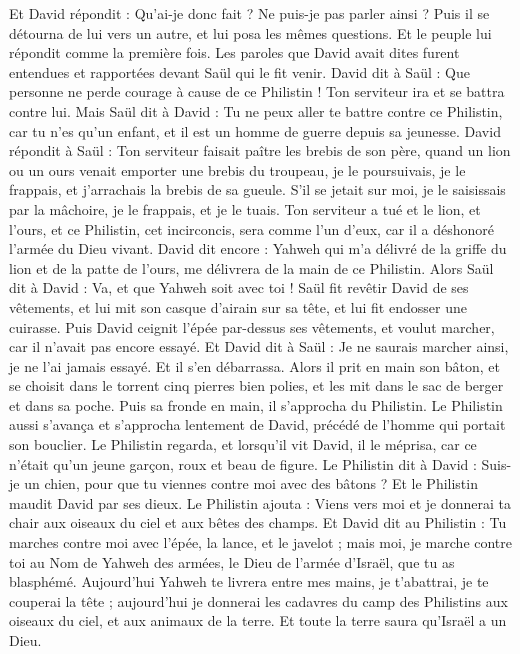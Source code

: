 \begin{multicols}{2}
Et David répondit : Qu'ai-je donc fait ? Ne puis-je pas parler ainsi ?
Puis il se détourna de lui vers un autre, et lui posa les mêmes questions. Et le peuple lui répondit comme la première fois.
Les paroles que David avait dites furent entendues et rapportées devant Saül qui le fit venir.
David dit à Saül : Que personne ne perde courage à cause de ce Philistin ! Ton serviteur ira et se battra contre lui.
Mais Saül dit à David : Tu ne peux aller te battre contre ce Philistin, car tu n'es qu'un enfant, et il est un homme de guerre depuis sa jeunesse.
David répondit à Saül : Ton serviteur faisait paître les brebis de son père, quand un lion ou un ours venait emporter une brebis du troupeau,
je le poursuivais, je le frappais, et j'arrachais la brebis de sa gueule. S'il se jetait sur moi, je le saisissais par la mâchoire, je le frappais, et je le tuais.
Ton serviteur a tué et le lion, et l'ours, et ce Philistin, cet incirconcis, sera comme l'un d'eux, car il a déshonoré l'armée du Dieu vivant.
David dit encore : Yahweh qui m'a délivré de la griffe du lion et de la patte de l'ours, me délivrera de la main de ce Philistin. Alors Saül dit à David : Va, et que Yahweh soit avec toi !
Saül fit revêtir David de ses vêtements, et lui mit son casque d'airain sur sa tête, et lui fit endosser une cuirasse.
Puis David ceignit l'épée par-dessus ses vêtements, et voulut marcher, car il n'avait pas encore essayé. Et David dit à Saül : Je ne saurais marcher ainsi, je ne l'ai jamais essayé. Et il s'en débarrassa.
Alors il prit en main son bâton, et se choisit dans le torrent cinq pierres bien polies, et les mit dans le sac de berger et dans sa poche. Puis sa fronde en main, il s'approcha du Philistin.
Le Philistin aussi s'avança et s'approcha lentement de David, précédé de l'homme qui portait son bouclier.
Le Philistin regarda, et lorsqu'il vit David, il le méprisa, car ce n'était qu'un jeune garçon, roux et beau de figure.
Le Philistin dit à David : Suis-je un chien, pour que tu viennes contre moi avec des bâtons ? Et le Philistin maudit David par ses dieux.
Le Philistin ajouta : Viens vers moi et je donnerai ta chair aux oiseaux du ciel et aux bêtes des champs.
Et David dit au Philistin : Tu marches contre moi avec l'épée, la lance, et le javelot ; mais moi, je marche contre toi au Nom de Yahweh des armées, le Dieu de l'armée d'Israël, que tu as blasphémé.
Aujourd'hui Yahweh te livrera entre mes mains, je t'abattrai, je te couperai la tête ; aujourd'hui je donnerai les cadavres du camp des Philistins aux oiseaux du ciel, et aux animaux de la terre. Et toute la terre saura qu'Israël a un Dieu.

\end{multicols}
